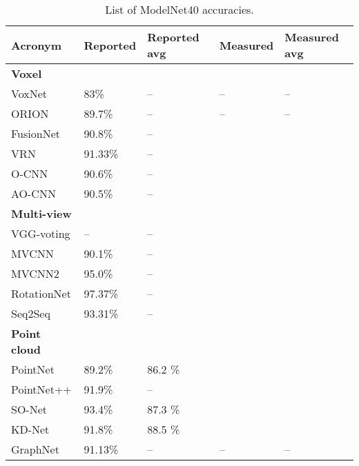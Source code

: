\begin{table}[]
	\begin{tabular}{lllll}
		\hline
		\textbf{Acronym}       & Reported & Reported avg & Measured & Measured avg \\ \hline
		\textbf{Voxel }        &          &              &          &              \\
		VoxNet                 & 83\%     & --           & --       & --           \\
		ORION                  & 89.7\%   & --           & --       & --           \\
		FusionNet              & 90.8\%   & --           &          &              \\
		VRN                    & 91.33\%  & --           &          &              \\
		O-CNN                  & 90.6\%   & --           &          &              \\
		AO-CNN                 & 90.5\%   & --           &          &              \\
		\textbf{Multi-view }   &          &              &          &              \\
		VGG-voting             & --       & --           &          &              \\
		MVCNN                  & 90.1\%   & --           &          &              \\
		MVCNN2                 & 95.0\%   & --           &          &              \\
		RotationNet            & 97.37\%  & --           &          &              \\
		Seq2Seq                & 93.31\%  & --           &          &              \\
		\textbf{Point cloud  } &          &              &          &              \\
		PointNet               & 89.2\%   & 86.2  \%     &          &              \\
		PointNet++             & 91.9\%   & --           &          &              \\
		SO-Net                 & 93.4\%   & 87.3  \%     &          &              \\
		KD-Net                 & 91.8\%   & 88.5  \%     &          &              \\
		GraphNet               & 91.13\%  & --           & --       & --
	\end{tabular}
\caption{List of ModelNet40 accuracies.}
\label{Table:accs}
\end{table}